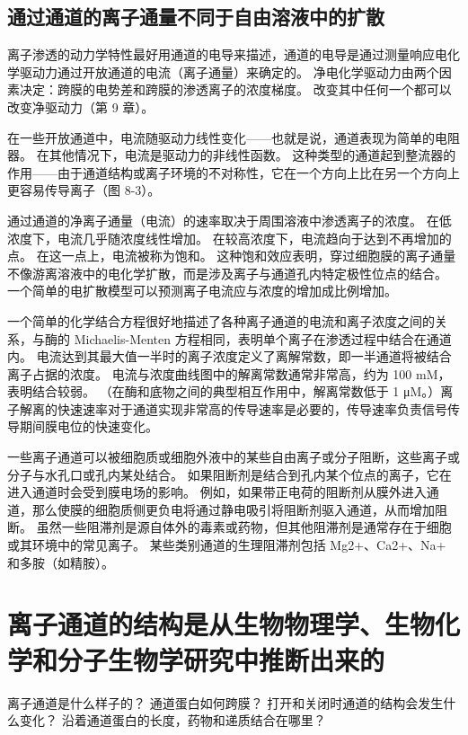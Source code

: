 \subsection{通过通道的离子通量不同于自由溶液中的扩散}
离子渗透的动力学特性最好用通道的电导来描述，通道的电导是通过测量响应电化学驱动力通过开放通道的电流（离子通量）来确定的。 
净电化学驱动力由两个因素决定：跨膜的电势差和跨膜的渗透离子的浓度梯度。 
改变其中任何一个都可以改变净驱动力（第 9 章）。


在一些开放通道中，电流随驱动力线性变化——也就是说，通道表现为简单的电阻器。 
在其他情况下，电流是驱动力的非线性函数。 
这种类型的通道起到整流器的作用——由于通道结构或离子环境的不对称性，它在一个方向上比在另一个方向上更容易传导离子（图 8-3）。


通过通道的净离子通量（电流）的速率取决于周围溶液中渗透离子的浓度。 
在低浓度下，电流几乎随浓度线性增加。 
在较高浓度下，电流趋向于达到不再增加的点。 
在这一点上，电流被称为饱和。 
这种饱和效应表明，穿过细胞膜的离子通量不像游离溶液中的电化学扩散，而是涉及离子与通道孔内特定极性位点的结合。 
一个简单的电扩散模型可以预测离子电流应与浓度的增加成比例增加。


一个简单的化学结合方程很好地描述了各种离子通道的电流和离子浓度之间的关系，与酶的 Michaelis-Menten 方程相同，表明单个离子在渗透过程中结合在通道内。 
电流达到其最大值一半时的离子浓度定义了离解常数，即一半通道将被结合离子占据的浓度。 
电流与浓度曲线图中的解离常数通常非常高，约为 100 mM，表明结合较弱。 （在酶和底物之间的典型相互作用中，解离常数低于 1 μM。）离子解离的快速速率对于通道实现非常高的传导速率是必要的，传导速率负责信号传导期间膜电位的快速变化。


一些离子通道可以被细胞质或细胞外液中的某些自由离子或分子阻断，这些离子或分子与水孔口或孔内某处结合。 如果阻断剂是结合到孔内某个位点的离子，它在进入通道时会受到膜电场的影响。 
例如，如果带正电荷的阻断剂从膜外进入通道，那么使膜的细胞质侧更负电将通过静电吸引将阻断剂驱入通道，从而增加阻断。 
虽然一些阻滞剂是源自体外的毒素或药物，但其他阻滞剂是通常存在于细胞或其环境中的常见离子。 
某些类别通道的生理阻滞剂包括 Mg2+、Ca2+、Na+ 和多胺（如精胺）。



\section{离子通道的结构是从生物物理学、生物化学和分子生物学研究中推断出来的}
离子通道是什么样子的？ 
通道蛋白如何跨膜？ 
打开和关闭时通道的结构会发生什么变化？ 
沿着通道蛋白的长度，药物和递质结合在哪里？


